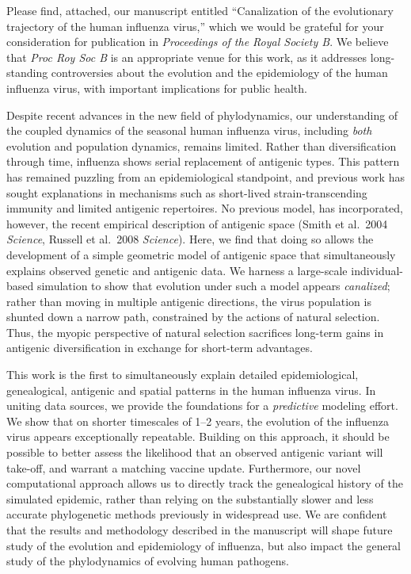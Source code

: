 \documentclass[stdletter,letterpaper,addrfromright,orderfromdateto,dateleft,11pt,noaddrto,sigleft]{newlfm}
\begin{document}
\begin{newlfm}

Please find, attached, our manuscript entitled ``Canalization of the evolutionary trajectory of the human influenza virus,'' which we would be grateful for your consideration for publication in \textit{Proceedings of the Royal Society B}.  We believe that \textit{Proc Roy Soc B} is an appropriate venue for this work, as it addresses long-standing controversies about the evolution and the epidemiology of the human influenza virus, with important implications for public health.

Despite recent advances in the new field of phylodynamics, our understanding of the coupled dynamics of the seasonal human influenza virus, including \textit{both} evolution and population dynamics, remains limited.  Rather than diversification through time, influenza shows serial replacement of antigenic types.  This pattern has remained puzzling from an epidemiological standpoint, and previous work has sought explanations in mechanisms such as short-lived strain-transcending immunity and limited antigenic repertoires.  No previous model, has incorporated, however, the recent empirical description of antigenic space (Smith et al.\ 2004 \textit{Science}, Russell et al.\ 2008 \textit{Science}).  Here, we find that doing so allows the development of a simple geometric model of antigenic space that simultaneously explains observed genetic and antigenic data.  We harness a large-scale individual-based simulation to show that evolution under such a model appears \textit{canalized}; rather than moving in multiple antigenic directions, the virus population is shunted down a narrow path, constrained by the actions of natural selection.  Thus, the myopic perspective of natural selection sacrifices long-term gains in antigenic diversification in exchange for short-term advantages.

This work is the first to simultaneously explain detailed epidemiological, genealogical, antigenic and spatial patterns in the human influenza virus.  In uniting data sources, we provide the foundations for a \textit{predictive} modeling effort.  We show that on shorter timescales of 1--2 years, the evolution of the influenza virus appears exceptionally repeatable.  Building on this approach, it should be possible to better assess the likelihood that an observed antigenic variant will take-off, and warrant a matching vaccine update.  Furthermore, our novel computational approach allows us to directly track the genealogical history of the simulated epidemic, rather than relying on the substantially slower and less accurate phylogenetic methods previously in widespread use.  We are confident that the results and methodology described in the manuscript will shape future study of the evolution and epidemiology of influenza, but also impact the general study of the phylodynamics of evolving human pathogens.

\end{newlfm}
\end{document}
